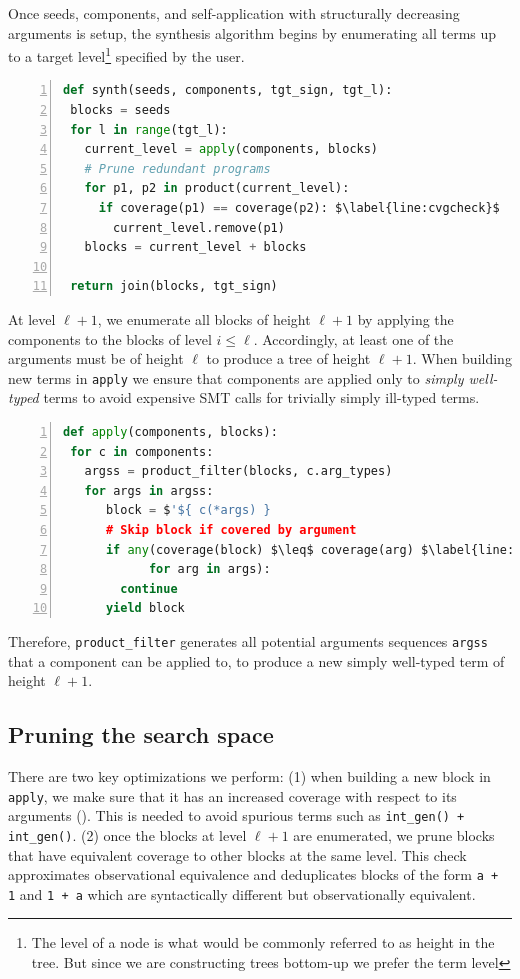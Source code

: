 \documentclass[review, sigplan]{acmart}
\begin{document}
Once seeds, components, and self-application with structurally decreasing
arguments is setup, the synthesis algorithm begins by enumerating
all terms up to a target level\footnote{The level of a node is what would
  be commonly referred to as height in the tree. But since
  we are constructing trees bottom-up we prefer the term level} specified by the user.
\begin{lstlisting}[language=Python, basicstyle=\small\ttfamily, mathescape, numbers=left, numbersep=3pt]
def synth(seeds, components, tgt_sign, tgt_l):
 blocks = seeds
 for l in range(tgt_l):
   current_level = apply(components, blocks)
   # Prune redundant programs
   for p1, p2 in product(current_level):
     if coverage(p1) == coverage(p2): $\label{line:cvgcheck}$
       current_level.remove(p1)
   blocks = current_level + blocks

 return join(blocks, tgt_sign)
\end{lstlisting}
At level $\ell + 1$, we enumerate all blocks of height $\ell + 1$ by applying
the components to the blocks of level $i \leq \ell$.
Accordingly, at least one of the arguments must be of height $\ell$ to produce
a tree of height $\ell + 1$.
When building new terms in \lstinline[basicstyle=\small\ttfamily]|apply|
we ensure that components are applied only to \emph{simply well-typed} terms
to avoid expensive SMT calls for trivially simply ill-typed terms.

\begin{lstlisting}[language=Python, basicstyle=\small\ttfamily, mathescape, numbers=left, numbersep=3pt]
def apply(components, blocks):
 for c in components:
   argss = product_filter(blocks, c.arg_types)
   for args in argss:
      block = $'${ c(*args) }
      # Skip block if covered by argument
      if any(coverage(block) $\leq$ coverage(arg) $\label{line:cvginc}$
            for arg in args):
        continue
      yield block
\end{lstlisting}

Therefore, \lstinline[basicstyle=\small\ttfamily]|product_filter|
generates all potential arguments sequences \lstinline[basicstyle=\small\ttfamily]|argss|
that a component can be applied to, to produce a new simply well-typed
term of height $\ell + 1$.

\subsection{Pruning the search space}
There are two key optimizations we perform:
(1) when building a new block in \lstinline[basicstyle=\small\ttfamily]|apply|,
we make sure that it has an increased coverage with respect to its arguments ().
This is needed to avoid spurious terms such as
\lstinline[basicstyle=\small\ttfamily]|int_gen() + int_gen()|.
(2) once the blocks at level $\ell + 1$ are enumerated,
we prune blocks that have equivalent coverage to other blocks at the same
level.
This check approximates observational equivalence and deduplicates
blocks of the form \lstinline[basicstyle=\small\ttfamily]|a + 1|
and \lstinline[basicstyle=\small\ttfamily]|1 + a| which are
syntactically different but observationally equivalent.
\end{document}
